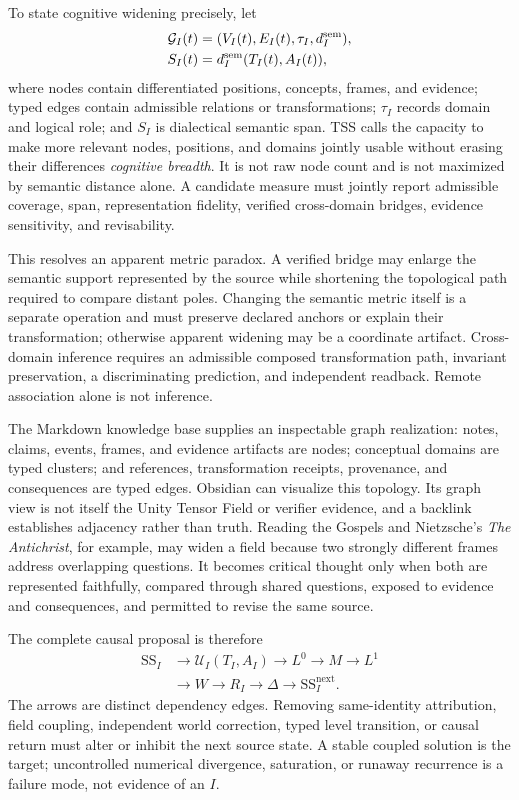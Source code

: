 \documentclass[10pt,twocolumn]{article}
\theoremstyle{definition}
\theoremstyle{plain}
\theoremstyle{remark}
\begin{document}
To state cognitive widening precisely, let
\begin{align}
\mathcal G_I(t)&=(V_I(t),E_I(t),\tau_I,d_I^{\mathrm{sem}}),\notag\\
S_I(t)&=d_I^{\mathrm{sem}}(T_I(t),A_I(t)),
\label{eq:tss-span}
\end{align}
where nodes contain differentiated positions, concepts, frames, and evidence; typed edges contain admissible relations or transformations; $\tau_I$ records domain and logical role; and $S_I$ is dialectical semantic span.  TSS calls the capacity to make more relevant nodes, positions, and domains jointly usable without erasing their differences \emph{cognitive breadth}.  It is not raw node count and is not maximized by semantic distance alone.  A candidate measure must jointly report admissible coverage, span, representation fidelity, verified cross-domain bridges, evidence sensitivity, and revisability.

This resolves an apparent metric paradox.  A verified bridge may enlarge the semantic support represented by the source while shortening the topological path required to compare distant poles.  Changing the semantic metric itself is a separate operation and must preserve declared anchors or explain their transformation; otherwise apparent widening may be a coordinate artifact.  Cross-domain inference requires an admissible composed transformation path, invariant preservation, a discriminating prediction, and independent readback.  Remote association alone is not inference.

The Markdown knowledge base supplies an inspectable graph realization: notes, claims, events, frames, and evidence artifacts are nodes; conceptual domains are typed clusters; and references, transformation receipts, provenance, and consequences are typed edges.  Obsidian can visualize this topology.  Its graph view is not itself the Unity Tensor Field or verifier evidence, and a backlink establishes adjacency rather than truth.  Reading the Gospels and Nietzsche's \emph{The Antichrist}, for example, may widen a field because two strongly different frames address overlapping questions.  It becomes critical thought only when both are represented faithfully, compared through shared questions, exposed to evidence and consequences, and permitted to revise the same source.

The complete causal proposal is therefore
\[
\begin{aligned}
\mathrm{SS}_I&\longrightarrow\mathcal U_I(T_I,A_I)\longrightarrow L^0
\longrightarrow M\longrightarrow L^1\\
&\longrightarrow W\longrightarrow R_I\longrightarrow\Delta
\longrightarrow\mathrm{SS}_I^{\mathrm{next}}.
\end{aligned}
\]
The arrows are distinct dependency edges.  Removing same-identity attribution, field coupling, independent world correction, typed level transition, or causal return must alter or inhibit the next source state.  A stable coupled solution is the target; uncontrolled numerical divergence, saturation, or runaway recurrence is a failure mode, not evidence of an $I$.
\end{document}
